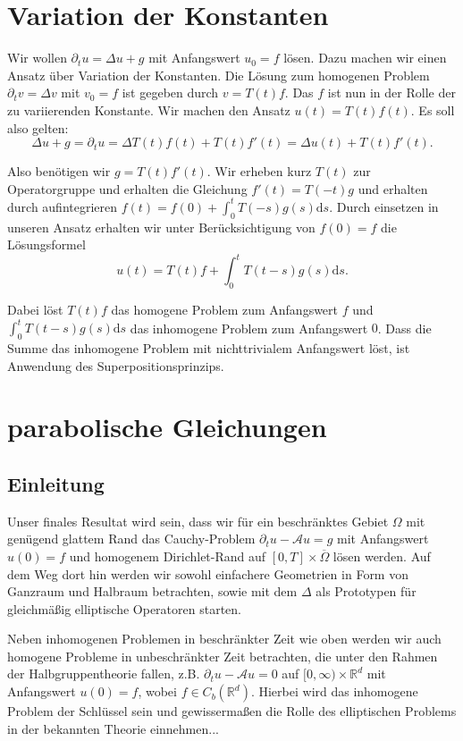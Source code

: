 \documentclass[11pt,a4paper]{scrartcl}
\newcommand{\R}{\mathbb{R}} %
\newcommand{\A}{\mathcal{A}}
\theoremstyle{plain}
\theoremstyle{definition}
\theoremstyle{remark}
\begin{document}


\section{Variation der Konstanten}

Wir wollen $\partial_t u = \Delta u + g$ mit Anfangswert $u_0=f$ lösen. Dazu machen wir einen Ansatz über Variation der Konstanten. Die Lösung zum homogenen Problem $\partial_t v = \Delta v$ mit $v_0=f$ ist gegeben durch $v=T(t)f$. Das $f$ ist nun in der Rolle der zu variierenden Konstante. Wir machen den Ansatz $u(t)=T(t)f(t)$. Es soll also gelten: $$\Delta u + g = \partial_t u = \Delta T(t)f(t) + T(t)f'(t) = \Delta u(t) + T(t)f'(t).$$

Also benötigen wir $g = T(t)f'(t)$. Wir erheben kurz $T(t)$ zur Operatorgruppe und erhalten die Gleichung $f'(t)=T(-t)g$ und erhalten durch aufintegrieren $f(t)=f(0)+\int_0^t T(-s)g(s) \mathrm{d}s$. Durch einsetzen in unseren Ansatz erhalten wir unter Berücksichtigung von $f(0)=f$ die Lösungsformel $$u(t)=T(t)f+\int_0^t T(t-s)g(s) \mathrm{d}s.$$

Dabei löst $T(t)f$ das homogene Problem zum Anfangswert $f$ und $\int_0^t T(t-s)g(s)\mathrm{d}s$ das inhomogene Problem zum Anfangswert $0$. Dass die Summe das inhomogene Problem mit nichttrivialem Anfangswert löst, ist Anwendung des Superpositionsprinzips.

\section{parabolische Gleichungen}

\subsection{Einleitung}

Unser finales Resultat wird sein, dass wir für ein beschränktes Gebiet $\Omega$ mit genügend glattem Rand das Cauchy-Problem $\partial_t u - \A u = g$ mit Anfangswert $u(0)=f$ und homogenem Dirichlet-Rand auf $[0,T]\times \overline{\Omega}$ lösen werden. Auf dem Weg dort hin werden wir sowohl einfachere Geometrien in Form von Ganzraum und Halbraum betrachten, sowie mit dem $\Delta$ als Prototypen für gleichmäßig elliptische Operatoren starten.

Neben inhomogenen Problemen in beschränkter Zeit wie oben werden wir auch homogene Probleme in unbeschränkter Zeit betrachten, die unter den Rahmen der Halbgruppentheorie fallen, z.B. $\partial_t u - \A  u = 0$ auf $[0,\infty)\times \R^d$ mit Anfangswert $u(0)=f$, wobei $f\in C_b(\R^d)$. Hierbei wird das inhomogene Problem der Schlüssel sein und gewissermaßen die Rolle des elliptischen Problems in der bekannten Theorie einnehmen...
\end{document}
